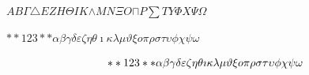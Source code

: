 \documentclass{article}%
\begin{document}
%
$A{}$$B{}$$\Gamma{}$$\triangle{}$$E{}$$Z{}$$H{}$$\Theta{}$$I{}$$K{}$$\wedge{}$$M{}$$N{}$$\Xi{}$$O{}$$\sqcap{}$$P{}$$\sum{}$$T{}$$Y{}$$\Phi{}$$X{}$$\Psi{}$$\Omega{}$%

%
 $**123**\alpha{}\beta{}\gamma{}\delta{}\varepsilon{}\zeta{}\eta{}\theta{}\imath{}\kappa{}\lambda{}\mu{}\vartheta{}\xi{}o{}\pi{}\rho{}\sigma{}\tau{}\upsilon{}\phi{}\chi{}\psi{}\omega{}$ %

%

%
\[%
**123**\alpha{}\beta{}\gamma{}\delta{}\varepsilon{}\zeta{}\eta{}\theta{}\imath{}\kappa{}\lambda{}\mu{}\vartheta{}\xi{}o{}\pi{}\rho{}\sigma{}\tau{}\upsilon{}\phi{}\chi{}\psi{}\omega{}\\%
\]%

%
\end{document}
